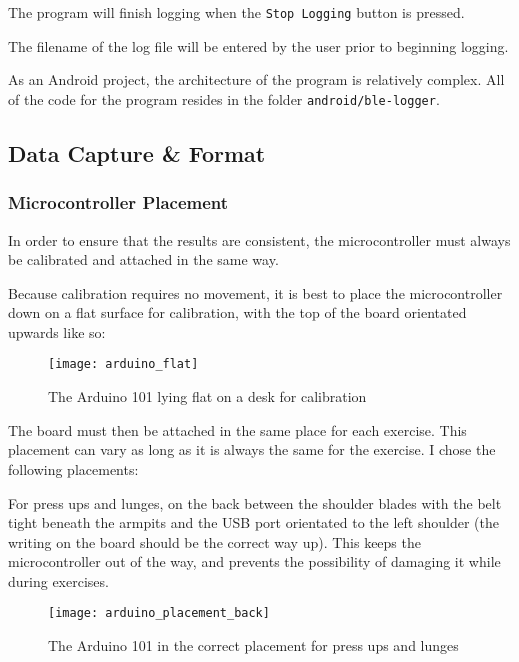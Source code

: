 \documentclass[a4paper]{article}
\begin{document}
The program will finish logging when the \lstinline{Stop Logging} button is pressed.

The filename of the log file will be entered by the user prior to beginning logging.

As an Android project, the architecture of the program is relatively complex. All of the code for the program resides in the folder \lstinline{android/ble-logger}. 


\subsection{Data Capture \& Format}%
\label{subsec:dc_datacapture}

\subsubsection{Microcontroller Placement}
\label{subsubsec:dc_dc_placement}

In order to ensure that the results are consistent, the microcontroller must always be calibrated and attached in the same way.

Because calibration requires no movement, it is best to place the microcontroller down on a flat surface for calibration, with the top of the board orientated upwards like so:

\begin{figure}[H]
    \centering
        \texttt{[image: arduino\_flat]}
        \caption{The Arduino 101 lying flat on a desk for calibration}
        \label{fig:ar_flat}
\end{figure}

The board must then be attached in the same place for each exercise. This placement can vary as long as it is always the same for the exercise. I chose the following placements:

For press ups and lunges, on the back between the shoulder blades with the belt tight beneath the armpits and the USB port orientated to the left shoulder (the writing on the board should be the correct way up). This keeps the microcontroller out of the way, and prevents the possibility of damaging it while during exercises.

\begin{figure}[H]
    \centering
        \texttt{[image: arduino\_placement\_back]}
        \caption{The Arduino 101 in the correct placement for press ups and lunges}
        \label{fig:ar_placement_back}
\end{figure}
\end{document}
